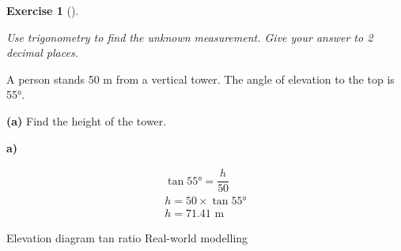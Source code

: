 \documentclass[
  letterpaper,
  DIV=11,
  numbers=noendperiod]{scrreprt}
\theoremstyle{definition}
\newtheorem{exercise}{Exercise}[chapter]
\theoremstyle{remark}
\begin{document}
\begin{exercise}[]\protect\hypertarget{exr-trig-13}{}\label{exr-trig-13}

\emph{Use trigonometry to find the unknown measurement. Give your answer
to 2 decimal places.}

A person stands 50 m from a vertical tower. The angle of elevation to
the top is 55°.

\textbf{(a)} Find the height of the tower.

\begin{tcolorbox}[enhanced jigsaw, opacitybacktitle=0.6, coltitle=black, arc=.35mm, colframe=quarto-callout-tip-color-frame, colback=white, bottomrule=.15mm, left=2mm, colbacktitle=quarto-callout-tip-color!10!white, titlerule=0mm, opacityback=0, title=\textcolor{quarto-callout-tip-color}{\faLightbulb}\hspace{0.5em}{🔍 View Solution}, leftrule=.75mm, breakable, rightrule=.15mm, bottomtitle=1mm, toptitle=1mm, toprule=.15mm]

\textbf{a)}

\[
\begin{aligned}
\tan 55° = \dfrac{h}{50} \\ h = 50 \times \tan 55° \\ h = 71.41 \text{ m}
\end{aligned}
\]

\end{tcolorbox}

{Elevation diagram} {tan ratio} {Real-world modelling}

\end{exercise}
\end{document}
